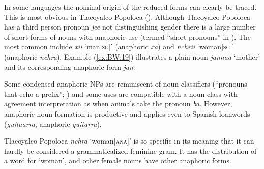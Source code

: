 \documentclass[output=collectionpaper]{langsci/langscibook}
\begin{document}
In some languages the nominal origin of the reduced forms can clearly be traced. This is most obvious in Tlacoyalco Popoloca (\citealt{Stark2011}). Although Tlacoyalco Popoloca has a third person pronoun \textit{je\textquotesingle e} not distinguishing gender there is a large number of short forms of nouns with anaphoric use (termed “short pronouns” in \citealt[3]{Stark2011}). The most common include \textit{xii} ‘man[\textsc{sg}]’ (anaphoric \textit{xa}) and \textit{nchrii} ‘woman[\textsc{sg}]’ (anaphoric \textit{nchra}). Example (\ref{ex:BW:19}) illustrates a plain noun \textit{janna\textquotesingle a} ‘mother’ and its corresponding anaphoric form \textit{jan}:

%

Some condensed anaphoric NPs are reminiscent of noun classifiers (“pronouns that echo a prefix”; \citealt[4]{Stark2011}) and some uses are compatible with a noun class with agreement interpretation as when animals take the pronoun \textit{ba}. However, anaphoric noun formation is productive and applies even to Spanish loanwords (\textit{guitaarra}, anaphoric \textit{guitarra}).

Tlacoyalco Popoloca \textit{nchra} ‘woman[\textsc{ana}]’ is so specific in its meaning that it can hardly be considered a grammaticalized feminine gram. It has the distribution of a word for ‘woman’, and other female nouns have other anaphoric forms.
\end{document}
